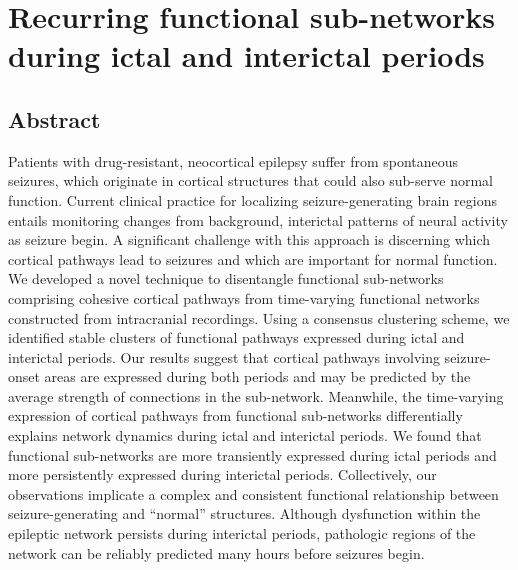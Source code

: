 \chapter{Recurring functional sub-networks during ictal and interictal periods}
\label{ch:mapsubnet}

\ifpdf
    \graphicspath{{chapters/ch4_figures/PNG/}{chapters/ch4_figures/PDF/}{chapters/ch4_figures/}}
\else
    \graphicspath{{chapters/ch4_figures/EPS/}{chapters/ch4_figures/}}
\fi


\section{Abstract}
Patients with drug-resistant, neocortical epilepsy suffer from spontaneous seizures, which originate in cortical structures that could also sub-serve normal function. Current clinical practice for localizing seizure-generating brain regions entails monitoring changes from background, interictal patterns of neural activity as seizure begin. A significant challenge with this approach is discerning which cortical pathways lead to seizures and which are important for normal function. We developed a novel technique to disentangle functional sub-networks comprising cohesive cortical pathways from time-varying functional networks constructed from intracranial recordings. Using a consensus clustering scheme, we identified stable clusters of functional pathways expressed during ictal and interictal periods. Our results suggest that cortical pathways involving seizure-onset areas are expressed during both periods and may be predicted by the average strength of connections in the sub-network. Meanwhile, the time-varying expression of cortical pathways from functional sub-networks differentially explains network dynamics during ictal and interictal periods. We found that functional sub-networks are more transiently expressed during ictal periods and more persistently expressed during interictal periods. Collectively, our observations implicate a complex and consistent functional relationship between seizure-generating and ``normal'' structures. Although dysfunction within the epileptic network persists during interictal periods, pathologic regions of the network can be reliably predicted many hours before seizures begin.

